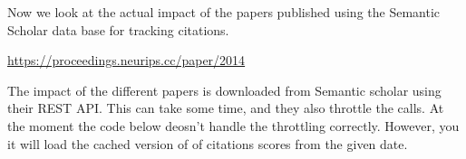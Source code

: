 Now we look at the actual impact of the papers published using the
Semantic Scholar data base for tracking citations.

\begin{Shaded}
\begin{Highlighting}[]
\end{Highlighting}
\end{Shaded}

\begin{Shaded}
\begin{Highlighting}[]
\end{Highlighting}
\end{Shaded}

\begin{Shaded}
\begin{Highlighting}[]
\OperatorTok{=}
\end{Highlighting}
\end{Shaded}

\url{https://proceedings.neurips.cc/paper/2014}

\begin{Shaded}
\begin{Highlighting}[]
\OperatorTok{=}  
\end{Highlighting}
\end{Shaded}

The impact of the different papers is downloaded from Semantic scholar
using their REST API. This can take some time, and they also throttle
the calls. At the moment the code below deosn't handle the throttling
correctly. However, you it will load the cached version of of citations
scores from the given date.

\begin{Shaded}
\begin{Highlighting}[]
\OperatorTok{=}\StringTok{\textquotesingle{}}\NormalTok{)}
\NormalTok{:}
\OperatorTok{=} 
\end{Highlighting}
\end{Shaded}

